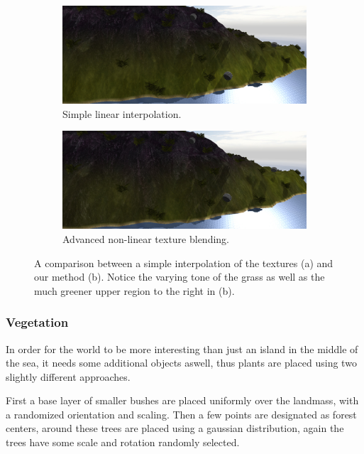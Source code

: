 \newpage
\begin{figure}[H]
\begin{subfigure}{0.9\textwidth}
  \centering
  \includegraphics[width=0.9\linewidth]{images/textureBlendingComparison2_simple.jpg}
  \caption{Simple linear interpolation.}
\end{subfigure}

\begin{subfigure}{0.9\textwidth}
  \centering
  \includegraphics[width=0.9\linewidth]{images/textureBlendingComparison2_advanced.jpg}
  \caption{Advanced non-linear texture blending.}
\end{subfigure}
\label{fig:textureComparison2}
\caption{A comparison between a simple interpolation of the textures (a) and our method (b). Notice the varying tone of the grass as well as the much greener upper region to the right in (b).}
\end{figure}

\newpage
\subsubsection{Vegetation}
In order for the world to be more interesting than just an island in the middle of the sea, it needs some additional objects aswell, thus plants are placed using two slightly different approaches.

First a base layer of smaller bushes are placed uniformly over the landmass, with a randomized orientation and scaling. Then a few points are designated as forest centers, around these trees are placed using a gaussian distribution, again the trees have some scale and rotation randomly selected.

